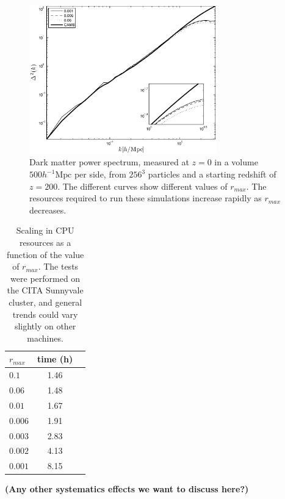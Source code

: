 \begin{figure}%
  \begin{center}
    \includegraphics[width=3.2in]{graphs/power_ra_max.eps}
  \caption{Dark matter power spectrum, measured at $z=0$ in a volume $500 h^{-1}\mbox{Mpc}$ per side,
  from $256^3$ particles and a starting redshift of $z=200$. The different curves show different values of $r_{max}$. 
  The resources required to run these simulations increase rapidly as $r_{max}$ decreases.    \label{fig:ra_max}}
\end{center}
\end{figure}

\begin{table}
\begin{center}
\caption{Scaling in {\small CPU} resources as a function of the value of $r_{max}$. The tests were performed 
on the CITA Sunnyvale cluster, and general trends could vary slightly on other machines.}
\begin{tabular}{|l|c|c|}
\hline 
$r_{max}$         & time (h)   \\                 
\hline
 $0.1$ & 1.46 \\
 $0.06$ & 1.48\\
 $0.01$ & 1.67 \\
 $0.006$ & 1.91\\
 $0.003$ & 2.83 \\
 $0.002$ & 4.13\\
 $0.001$ & 8.15\\
\hline
\end{tabular}
\label{table:ra_max}
\end{center}
\end{table}


{\bf (Any other systematics effects we want to discuss here?)}

 


